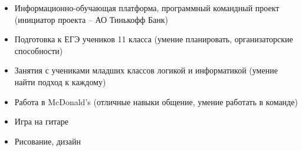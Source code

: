 \begin{itemize}
\item Информационно-обучающая платформа, программный командный проект (инициатор проекта -- АО Тинькофф Банк)
\end{itemize}


\begin{itemize}
\item Подготовка к ЕГЭ учеников 11 класса (умение планировать, организаторские способности)
\item Занятия с учениками младших классов логикой и информатикой (умение найти подход к каждому)
\item Работа в McDonald’s (отличные навыки общение, умение работать в команде)
\end{itemize}
\begin{itemize}
\item Игра на гитаре
\item Рисование, дизайн

\end{itemize}